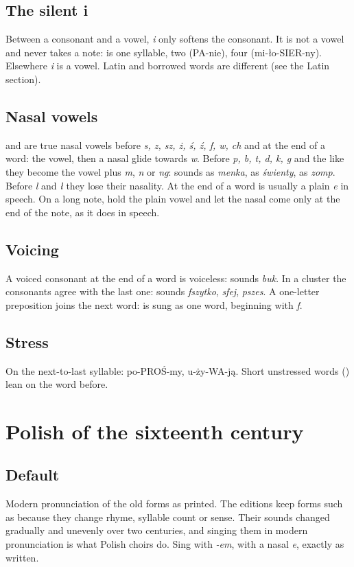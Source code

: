 \documentclass[guide]{pol-ren}
\begin{document}
\subsection{The silent i} Between a consonant and a vowel, \textit{i} only
softens the consonant. It is not a vowel and never takes a note:  is
one syllable,  two (PA-nie),  four
(mi-ło-SIER-ny). Elsewhere \textit{i} is a vowel. Latin and borrowed words
are different (see the Latin section).

\subsection{Nasal vowels}  and  are true nasal vowels before
\textit{s, z, sz, ż, ś, ź, f, w, ch} and at the end of a word: the vowel,
then a nasal glide towards \textit{w}. Before \textit{p, b, t, d, k, g} and
the like they become the vowel plus \textit{m}, \textit{n} or \textit{ng}:
 sounds as \textit{menka},  as \textit{świenty},
 as \textit{zomp}. Before \textit{l} and \textit{ł} they lose their
nasality. At the end of a word  is usually a plain \textit{e} in speech.
On a long note, hold the plain vowel and let the nasal come only at the end
of the note, as it does in speech.

\subsection{Voicing} A voiced consonant at the end of a word is voiceless:
 sounds \textit{buk}. In a cluster the consonants agree with the last
one:  sounds \textit{fszytko},  \textit{sfej},
 \textit{pszes}. A one-letter preposition joins the next word:
 is sung as one word, beginning with \textit{f}.

\subsection{Stress} On the next-to-last syllable: po-PROŚ-my,
u-ży-WA-ją. Short unstressed words () lean on the
word before.

\section*{Polish of the sixteenth century}

\subsection{Default} Modern pronunciation of the old forms as printed. The
editions keep forms such as 
because they change rhyme, syllable count or sense. Their sounds changed
gradually and unevenly over two centuries, and singing them in modern
pronunciation is what Polish choirs do. Sing  with \textit{-em},
 with a nasal \textit{e}, exactly as written.
\end{document}
